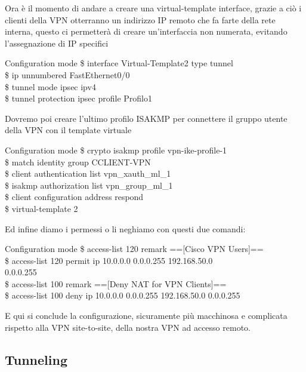 Ora è il momento di andare a creare una virtual-template interface, grazie a ciò i clienti della VPN otterranno un indirizzo IP remoto che fa farte della rete interna, questo ci permetterà di creare un’interfaccia non numerata, evitando l’assegnazione di IP specifici 

\begin{fcmds}{Configuration mode}
    \$ interface Virtual-Template2 type tunnel\\
    \$ ip unnumbered FastEthernet0/0\\
    \$ tunnel mode ipsec ipv4\\
    \$ tunnel protection ipsec profile Profilo1
\end{fcmds}

Dovremo poi creare l’ultimo profilo ISAKMP per connettere il gruppo utente della VPN con il template virtuale

\begin{fcmds}{Configuration mode}
    \$ crypto isakmp profile vpn-ike-profile-1\\
    \$ match identity group CCLIENT-VPN\\
    \$ client authentication list vpn\_xauth\_ml\_1\\
    \$ isakmp authorization list vpn\_group\_ml\_1\\
    \$ client configuration address respond\\
    \$ virtual-template 2
\end{fcmds}

Ed infine diamo i permessi o li neghiamo con questi due comandi:

\begin{fcmds}{Configuration mode}
    \$ access-list 120 remark ==[Cisco VPN Users]==\\
    \$ access-list 120 permit ip 10.0.0.0 0.0.0.255 192.168.50.0\\
    0.0.0.255\\
    \$ access-list 100 remark ==[Deny NAT for VPN Clients]==\\
    \$ access-list 100 deny ip 10.0.0.0 0.0.0.255 192.168.50.0 0.0.0.255
\end{fcmds}

E qui si conclude la configurazione, sicuramente più macchinosa e complicata rispetto alla VPN site-to-site, della nostra VPN ad accesso remoto.

\subsection{Tunneling}
